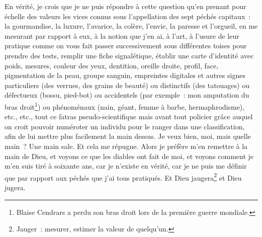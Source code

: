 {En vérité, je crois que je ne puis répondre à cette question qu'en
prenant pour échelle des valeurs les vices connus sous l'appellation
des sept péchés capitaux~: la gourmandise, la luxure, l'avarice, la
colère, l'envie, la paresse et l'orgueil, en me mesurant par rapport
à eux, à la notion que j'en ai, à l'art, à l'usure de leur pratique
comme on vous fait passer successivement sous différentes toises pour
prendre des tests, remplir une fiche signalétique, établir une carte
d'identité avec poids, mesures, couleur des yeux, dentition, oreille
droite, profil, face, pigmentation de la peau, groupe sanguin,
empreintes digitales et autres signes particuliers (des verrues, des
grains de beauté) ou distinctifs (des tatouages) ou défectueux
(bossu, pied-bot) ou accidentels (par exemple~: mon amputation du
bras droit\footnote{Blaise Cendrars a perdu son bras droit lors de la
première guerre mondiale.}) ou phénoménaux (nain, géant, femme à
barbe, hermaphrodisme), etc., etc., tout ce fatras
pseudo-scientifique mais avant tout policier grâce auquel on croit
pouvoir numéroter un individu pour le ranger dans une classification,
afin de lui mettre plus facilement la main dessus. Je veux bien, moi,
mais quelle main~? Une main sale. Et cela me répugne. Alors je
préfère m'en remettre à la main de Dieu, et voyons ce que les diables
ont fait de moi, et voyons comment je m'en suis tiré à soixante ans,
car je n'existe en vérité, car je ne puis me définir que par rapport
aux péchés que j'ai tous pratiqués. Et Dieu jaugera\footnote{Jauger~:
mesurer, estimer la valeur de quelqu'un.} et Dieu jugera.
}


